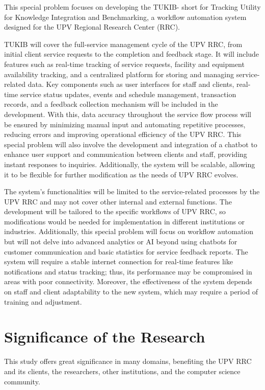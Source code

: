 This special problem focuses on developing the TUKIB- short for Tracking Utility for Knowledge Integration and Benchmarking, a workflow automation system designed for the UPV Regional Research Center (RRC). 

TUKIB will cover the full-service management cycle of the UPV RRC, from initial client service requests to the completion and feedback stage. It will include features such as real-time tracking of service requests, facility and equipment availability tracking, and a centralized platform for storing and managing service-related data. Key components such as user interfaces for staff and clients, real-time service status updates, events and schedule management, transaction records, and a feedback collection mechanism will be included in the development. With this, data accuracy throughout the service flow process will be ensured by minimizing manual input and automating repetitive processes, reducing errors and improving operational efficiency of the UPV RRC. This special problem will also involve the development and integration of a chatbot to enhance user support and communication between clients and staff, providing instant responses to inquiries. Additionally, the system will be scalable, allowing it to be flexible for further modification as the needs of UPV RRC evolves.

The system’s functionalities will be limited to the service-related processes by the UPV RRC and may not cover other internal and external functions. The development will be tailored to the specific workflows of UPV RRC, so modifications would be needed for implementation in different institutions or industries. Additionally, this special problem will focus on workflow automation but will not delve into advanced analytics or AI beyond using chatbots for customer communication and basic statistics for service feedback reports. The system will require a stable internet connection for real-time features like notifications and status tracking; thus, its performance may be compromised in areas with poor connectivity. Moreover, the effectiveness of the system depends on staff and client adaptability to the new system, which may require a period of training and adjustment.


\section{Significance of the Research}
\label{sec:significance}

This study offers great significance in many domains, benefiting the UPV RRC and its clients, the researchers, other institutions, and the computer science community.

